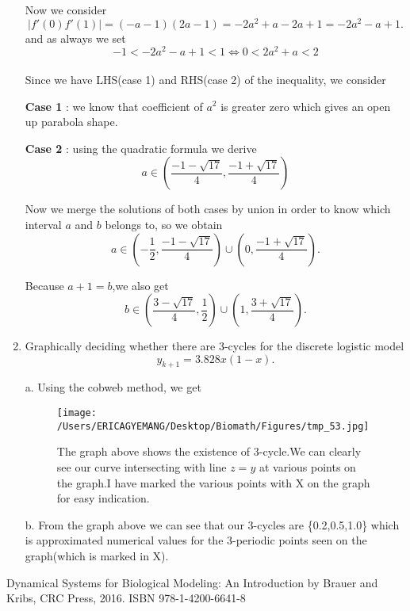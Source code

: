 \documentclass[12pt]{article}
\begin{document}
\begin{enumerate}
Now we consider
\[\left|f'(0)f'(1)\right|=(-a-1)(2a-1)=-2a^2+a-2a+1=-2a^2-a+1.\]
and as always we set
\[-1<-2a^2-a+1<1\Leftrightarrow \boxed{ 0<2a^2+a<2}\]\\
Since we have LHS(case 1) and RHS(case 2) of the inequality, we consider 

\textbf{Case 1} :  we know that coefficient of $a^2$ is greater zero which gives an open up parabola shape.
 
 \textbf{Case 2} :  using the quadratic formula we derive 
  \[a\in\left(\frac{-1-\sqrt{17}}{4},\frac{-1+\sqrt{17}}{4}\right)\]
  
 Now we merge the solutions of both cases by union in order to know which interval $a$ and $b$ belongs to, so we obtain
\[a\in\left(-\frac{1}{2},\frac{-1-\sqrt{17}}{4}\right)\cup\left(0,\frac{-1+\sqrt{17}}{4}\right).\]

Because $a+1=b$,we also get
\[b\in\left(\frac{3-\sqrt{17}}{4},\frac{1}{2}\right)\cup\left(1,\frac{3+\sqrt{17}}{4}\right).\]

\cleardoublepage

\item Graphically deciding whether there are 3-cycles  for the discrete logistic model
\[y_{k+1}=3.828x(1-x).\]

a. Using the cobweb method, we get

\begin{figure} [ht!]
 \centering
 \texttt{[image: /Users/ERICAGYEMANG/Desktop/Biomath/Figures/tmp\_53.jpg]} 
\caption[Figure 2.4: r>1]{The graph above shows the existence of 3-cycle.We can clearly see our curve intersecting with line $z=y$ at various points on the graph.I have marked the various points with X on the graph for easy indication.}
 \label{fig::model}
\end{figure}
\cleardoublepage

b. From the graph above we can see that our 3-cycles are \{0.2,0.5,1.0\} which is approximated numerical values for the 3-periodic points seen on the graph(which is marked in X).



\end{enumerate}

\cleardoublepage

\begin{thebibliography}{99}
Dynamical Systems for Biological Modeling: An Introduction by Brauer and Kribs, CRC Press, 2016. ISBN 978-1-4200-6641-8


\end{thebibliography}
\end{document}
